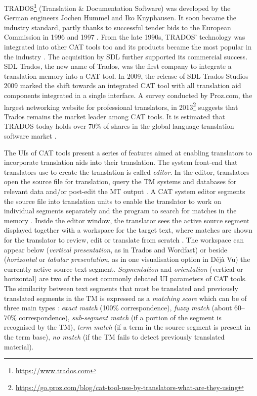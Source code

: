 TRADOS\footnote{\url{https://www.trados.com}} (Translation \& Documentation Software) was developed by the German engineers Jochen Hummel and Iko Knyphausen. It soon became the industry standard, partly thanks to successful tender bids to the European Commission in 1996 and 1997 \citep[70]{garcia2015computer}. From the late 1990s, TRADOS’ technology was integrated into other CAT tools too and its products became the most popular in the industry \citep[13]{chan2015}. The acquisition by SDL further supported its commercial success. SDL Trados, the new name of Trados, was the first company to integrate a translation memory into a CAT tool. In 2009, the release of SDL Trados Studios 2009 marked the shift towards an integrated CAT tool with all translation aid components integrated in a single interface. A survey conducted by Proz.com, the largest networking website for professional translators, in 2013\footnote{\url{https://go.proz.com/blog/cat-tool-use-by-translators-what-are-they-using}} suggests that Trados remains the market leader among CAT tools. It is estimated that TRADOS today holds over 70\% of shares in the global language translation software market \citep{Cheng2021}.

The UIs of CAT tools present a series of features aimed at enabling translators to incorporate translation aids into their translation. The system front-end that translators use to create the translation is called \textit{editor}. In the editor, translators open the source file for translation, query the TM systems and databases for relevant data and/or post-edit the MT output \citep[71]{garcia2015computer}. A CAT system editor segments the source file into translation units to enable the translator to work on individual segments separately and the program to search for matches in the memory \citep[72]{garcia2015computer}. Inside the editor window, the translator sees the active source segment displayed together with a workspace for the target text, where matches are shown for the translator to review, edit or translate from scratch \citep[72]{garcia2015computer}. The workspace can appear below (\textit{vertical presentation}, as in Trados and Wordfast) or beside (\textit{horizontal} or \textit{tabular presentation}, as in one visualisation option in Déjà Vu) the currently active source-text segment. \textit{Segmentation} and \textit{orientation} (vertical or horizontal) are two of the most commonly debated UI parameters of CAT tools. The similarity between text segments that must be translated and previously translated segments in the TM is expressed as a \textit{matching score} which can be of three main types \citep[61]{bowker2010computer}: \textit{exact match} (100\% correspondence), \textit{fuzzy match} (about 60--70\% correspondence), \textit{sub-segment match} (if a portion of the segment is recognised by the TM), \textit{term match} (if a term in the source segment is present in the term base), \textit{no match} (if the TM fails to detect previously translated material).

